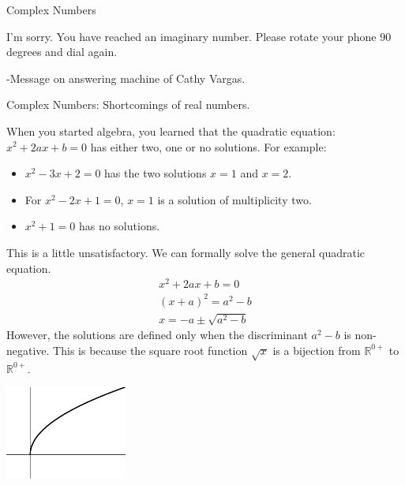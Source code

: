 \documentclass{slides}
\begin{document}
\begin{slide}
\begin{center}
\begin{Large}
Complex Numbers
\end{Large}
\end{center}


I'm sorry.  You have reached an imaginary number.  Please rotate your phone
$90$ degrees and dial again.

\begin{flushright}
  -Message on answering machine of Cathy Vargas.
\end{flushright}


\end{slide}






\begin{slide}
\begin{center}
\begin{large}
Complex Numbers: Shortcomings of real numbers.
\end{large}
\end{center}

When you started algebra, you learned that the quadratic equation:
$x^2 + 2 a x + b = 0$ has either two, one or no solutions.  For example:
\begin{itemize}
\item
  $x^2 - 3 x + 2 = 0$ has the two solutions $x = 1$ and $x = 2$.
\item
  For $x^2 - 2 x + 1 = 0$, $x = 1$ is a solution of multiplicity two.
\item
  $x^2 + 1 = 0$ has no solutions.
\end{itemize}
\end{slide}



\begin{slide}
This is a little unsatisfactory.  
We can formally solve the general quadratic equation.
\begin{gather*}
  x^2 + 2 a x + b = 0 
  \\
  (x + a)^2 = a^2 - b 
  \\
  x = -a \pm \sqrt{a^2 - b}
\end{gather*}
However, the solutions are defined only when the discriminant $a^2 -
b$ is non-negative.  This is because the square root function $\sqrt{x}$
is a bijection from $\mathbb{R}^{0+}$ to $\mathbb{R}^{0+}$. 
\begin{center}
  \includegraphics[width=0.3\textwidth]{yesqrtx}
\end{center}
\end{slide}
\end{document}
